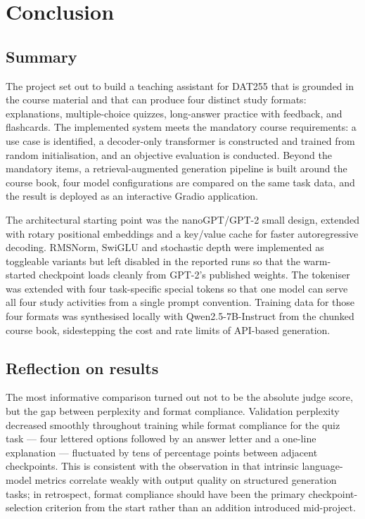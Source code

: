 \section{Conclusion}

\subsection*{Summary}

The project set out to build a teaching assistant for DAT255 that is grounded in the course
material and that can produce four distinct study formats: explanations, multiple-choice
quizzes, long-answer practice with feedback, and flashcards. The implemented system meets the
mandatory course requirements: a use case is identified, a decoder-only transformer is
constructed and trained from random initialisation, and an objective evaluation is conducted.
Beyond the mandatory items, a retrieval-augmented generation pipeline is built around the
course book, four model configurations are compared on the same task data, and the result is
deployed as an interactive Gradio application.

The architectural starting point was the nanoGPT/GPT-2 small design, extended with rotary
positional embeddings and a key/value cache for faster autoregressive decoding. RMSNorm,
SwiGLU and stochastic depth were implemented as toggleable variants but left disabled in
the reported runs so that the warm-started checkpoint loads cleanly from GPT-2's published
weights. The tokeniser was extended with four task-specific special tokens so that one
model can serve all four study activities from a single prompt convention. Training data
for those four formats was synthesised locally with Qwen2.5-7B-Instruct from the chunked
course book, sidestepping the cost and rate limits of API-based generation.

\subsection*{Reflection on results}

The most informative comparison turned out not to be the absolute judge score, but the gap
between perplexity and format compliance. Validation perplexity decreased smoothly throughout
training while format compliance for the quiz task --- four lettered options followed by an
answer letter and a one-line explanation --- fluctuated by tens of percentage points between
adjacent checkpoints. This is consistent with the observation in \cite{zheng2023judging}
that intrinsic language-model metrics correlate weakly with output quality on structured
generation tasks; in retrospect, format compliance should have been the primary
checkpoint-selection criterion from the start rather than an addition introduced
mid-project.

